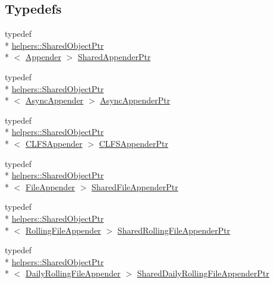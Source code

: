 \subsection*{Typedefs}
\begin{DoxyCompactItemize}
\item 
typedef \\*
\hyperlink{classlog4cplus_1_1helpers_1_1SharedObjectPtr}{helpers\-::\-Shared\-Object\-Ptr}\\*
$<$ \hyperlink{classlog4cplus_1_1Appender}{Appender} $>$ \hyperlink{namespacelog4cplus_a12d841b842c72396be9219ce67a0c215}{Shared\-Appender\-Ptr}
\item 
typedef \\*
\hyperlink{classlog4cplus_1_1helpers_1_1SharedObjectPtr}{helpers\-::\-Shared\-Object\-Ptr}\\*
$<$ \hyperlink{classlog4cplus_1_1AsyncAppender}{Async\-Appender} $>$ \hyperlink{namespacelog4cplus_ae8c69ec314f5839d527a425519f904b1}{Async\-Appender\-Ptr}
\item 
typedef \\*
\hyperlink{classlog4cplus_1_1helpers_1_1SharedObjectPtr}{helpers\-::\-Shared\-Object\-Ptr}\\*
$<$ \hyperlink{classlog4cplus_1_1CLFSAppender}{C\-L\-F\-S\-Appender} $>$ \hyperlink{namespacelog4cplus_acef2a286e5e50f87df800d6cc19b26a1}{C\-L\-F\-S\-Appender\-Ptr}
\item 
typedef \\*
\hyperlink{classlog4cplus_1_1helpers_1_1SharedObjectPtr}{helpers\-::\-Shared\-Object\-Ptr}\\*
$<$ \hyperlink{classlog4cplus_1_1FileAppender}{File\-Appender} $>$ \hyperlink{namespacelog4cplus_a9eb9b1a5e546194d616f5efca5f00de7}{Shared\-File\-Appender\-Ptr}
\item 
typedef \\*
\hyperlink{classlog4cplus_1_1helpers_1_1SharedObjectPtr}{helpers\-::\-Shared\-Object\-Ptr}\\*
$<$ \hyperlink{classlog4cplus_1_1RollingFileAppender}{Rolling\-File\-Appender} $>$ \hyperlink{namespacelog4cplus_a157dfdb199434cd2ace269a933b706b1}{Shared\-Rolling\-File\-Appender\-Ptr}
\item 
typedef \\*
\hyperlink{classlog4cplus_1_1helpers_1_1SharedObjectPtr}{helpers\-::\-Shared\-Object\-Ptr}\\*
$<$ \hyperlink{classlog4cplus_1_1DailyRollingFileAppender}{Daily\-Rolling\-File\-Appender} $>$ \hyperlink{namespacelog4cplus_a2a06b80823a63d74c784b75f494853ed}{Shared\-Daily\-Rolling\-File\-Appender\-Ptr}

\end{DoxyCompactItemize}
